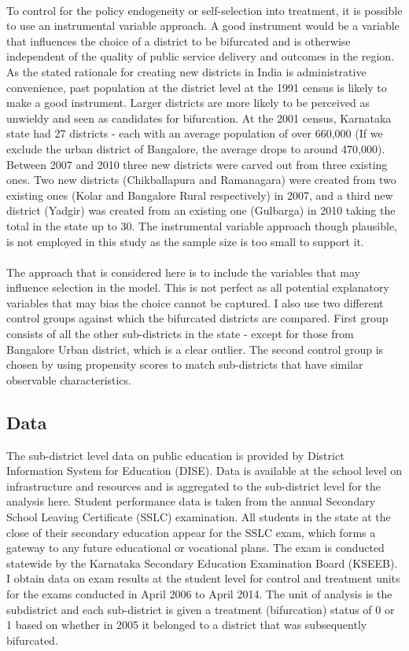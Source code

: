 \documentclass[12pt, a4paper]{article}
\begin{document}
\paragraph{} To control for the policy endogeneity or self-selection into treatment, it is possible to use an instrumental variable approach. A good instrument would be a variable that influences the choice of a district to be bifurcated and is otherwise independent of the quality of public service delivery and outcomes in the region. As the stated rationale for creating new districts in India is administrative convenience, past population at the district level at the 1991 census is likely to make a good instrument. Larger districts are more likely to be perceived as unwieldy and seen as candidates for bifurcation. At the 2001 census, Karnataka state had 27 districts - each with an average population of over 660,000 (If we exclude the urban district of Bangalore, the average drops to around 470,000). Between 2007 and 2010 three new districts were carved out from three existing ones. Two new districts (Chikballapura and Ramanagara) were created from two existing ones (Kolar and Bangalore Rural respectively) in 2007, and a third new district (Yadgir) was created from an existing one (Gulbarga) in 2010 taking the total in the state up to 30. The instrumental variable approach though plausible, is not employed in this study as the sample size is too small to support it. 

\paragraph{}The approach that is considered here is to include the variables that may influence selection in the model. This is not perfect as all potential explanatory variables that may bias the choice cannot be captured. I also use two different control groups against which the bifurcated districts are compared. First group consists of all the other sub-districts in the state - except for those from Bangalore Urban district, which is a clear outlier. The second control group is chosen by using propensity scores to match sub-districts that have similar observable characteristics. 
\subsection*{Data}
The sub-district level data on public education is provided by District Information System for Education (DISE). Data is available at the school level on infrastructure and resources and is aggregated to the sub-district level for the analysis here. Student performance data is taken from the annual Secondary School Leaving Certificate (SSLC) examination. All students in the state at the close of their secondary education appear for the SSLC exam, which forms a gateway to any future educational or vocational plans. The exam is conducted statewide by the Karnataka Secondary Education Examination Board (KSEEB). I obtain data on exam results at the student level for control and treatment units for the exams conducted in April 2006 to April 2014. The unit of analysis is the subdistrict and each sub-district is given a treatment (bifurcation) status of 0 or 1 based on whether in 2005 it belonged to a district that was subsequently bifurcated. 
\end{document}
